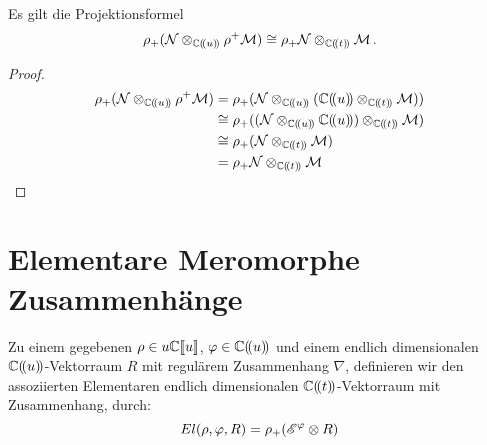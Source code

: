 \begin{thm} \label{thm:Projektionsformel}
\cite[1.a]{sabbah_Fourier-local}
Es gilt die Projektionsformel
\begin{equation} \label{eq:Projektionsformel}
\rho_+(\mathcal{N}\otimes_{\mathbb{C}(\!(u)\!)}\rho^+\mathcal{M}) \cong
\rho_+\mathcal{N}\otimes_{\mathbb{C}(\!(t)\!)}\mathcal{M}\,.
\end{equation}
\end{thm}
\begin{proof}
\begin{align*}
\rho_+(\cN\otimes_{\C(\!(u)\!)}\rho^+\cM) &=
\rho_+(\cN\otimes_{\C(\!(u)\!)}(\C(\!(u)\!)\otimes_{\C(\!(t)\!)}\cM)) \\
&\cong \rho_+((\cN\otimes_{\C(\!(u)\!)}\C(\!(u)\!))
\otimes_{\C(\!(t)\!)}\cM) \\
&\cong \rho_+(\cN\otimes_{\C(\!(t)\!)}\cM) \\
&= \rho_+\cN\otimes_{\C(\!(t)\!)}\cM \\
\end{align*}
\end{proof}

\begin{comment}
Sei $\rho(u)=u^p=t$ und $\phi(t)$ gegeben.
\begin{align*}
\rho^+\sE^{\phi(t)}&=\sE^{\phi(\rho(u))}=\sE^{\phi(u^p)}\\
\rho^+\rho_+\sE^{\phi(u)}
&=\underset{\zeta\in\mu_p}{\bigoplus}\sE^{\phi(\zeta\cdot u)}\\
\end{align*}
\end{comment}

\section{Elementare Meromorphe Zusammenhänge}

\begin{defn}
\cite[Def 2.1]{sabbah_Fourier-local}
Zu einem gegebenen $\rho\in u\mathbb{C}\llbracket u\rrbracket$,
$\varphi\in\mathbb{C}(\!(u)\!)$ und einem endlich dimensionalen
$\mathbb{C}(\!(u)\!)$-Vektorraum $R$ mit regulärem Zusammenhang $\nabla$,
definieren wir den assoziierten Elementaren endlich dimensionalen
$\mathbb{C}(\!(t)\!)$-Vektorraum mit Zusammenhang, durch:
\[
El(\rho,\varphi,R)=\rho_+(\mathscr{E}^\varphi\otimes R)
\]
\end{defn}



